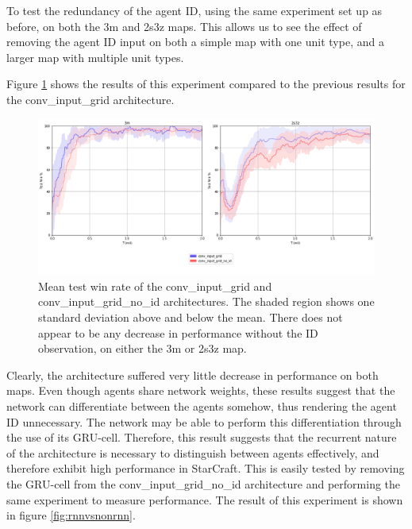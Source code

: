 To test the redundancy of the agent ID, using the same experiment set up as before, on both the 3m and 2s3z maps. This allows us to see the effect of removing the agent ID input on both a simple map with one unit type, and a larger map with multiple unit types.

Figure \ref{fig:noid} shows the results of this experiment compared to the previous results for the conv\_input\_grid architecture.

\begin{figure}
    \centering
    \hbox{\hspace{-6.6em}\includegraphics[scale=0.47]{images/graphs/noid.png}}
    \caption{Mean test win rate of the conv\_input\_grid and conv\_input\_grid\_no\_id architectures. The shaded region shows one standard deviation above and below the mean. There does not appear to be any decrease in performance without the ID observation, on either the 3m or 2s3z map.}
    \label{fig:noid}
\end{figure}


Clearly, the architecture suffered very little decrease in performance on both maps. Even though agents share network weights, these results suggest that the network can differentiate between the agents somehow, thus rendering the agent ID unnecessary. The network may be able to perform this differentiation through the use of its GRU-cell. Therefore, this result suggests that the recurrent nature of the architecture is necessary to distinguish between agents effectively, and therefore exhibit high performance in StarCraft. This is easily tested by removing the GRU-cell from the conv\_input\_grid\_no\_id architecture and performing the same experiment to measure performance. The result of this experiment is shown in figure \ref{fig:rnnvsnonrnn}.

